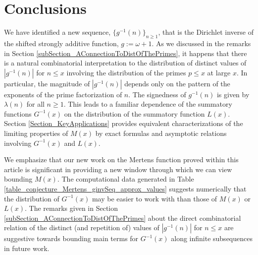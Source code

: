 \documentclass[11pt,reqno,a4letter]{article}
\numberwithin{figure}{section}
\numberwithin{table}{section}
\theoremstyle{plain}
\numberwithin{theorem}{section}
\theoremstyle{definition}
\begin{document}
\newpage
\section{Conclusions}

We have identified a new sequence, 
$\{g^{-1}(n)\}_{n \geq 1}$, that is the Dirichlet inverse of the 
shifted strongly additive function, $g := \omega + 1$. 
As we discussed in the remarks in 
Section \ref{subSection_AConnectionToDistOfThePrimes}, 
it happens that there is a natural combinatorial interpretation to the 
distribution of distinct values 
of $|g^{-1}(n)|$ for $n \leq x$ involving the distribution of the 
primes $p \leq x$ at large $x$. 
In particular, the magnitude of $|g^{-1}(n)|$ depends only on the pattern of 
the exponents of the prime factorization of $n$. 
The signedness of $g^{-1}(n)$ is given by $\lambda(n)$ for all $n \geq 1$. 
This leads to a familiar dependence of the 
summatory functions $G^{-1}(x)$ on the distribution of the summatory function $L(x)$. 
Section \ref{Section_KeyApplications} 
provides equivalent characterizations of the limiting properties of 
$M(x)$ by exact formulas and asymptotic relations involving 
$G^{-1}(x)$ and $L(x)$. 

We emphasize that our new work on the Mertens function proved within this article 
is significant in providing a new window through which we can view bounding $M(x)$. 
The computational data generated in 
Table \ref{table_conjecture_Mertens_ginvSeq_approx_values} suggests numerically 
that the distribution of $G^{-1}(x)$ may be easier to work with 
than those of $M(x)$ or $L(x)$. 
The remarks given in Section \ref{subSection_AConnectionToDistOfThePrimes} 
about the direct combinatorial 
relation of the distinct (and repetition of) values of $|g^{-1}(n)|$ 
for $n \leq x$ are suggestive towards bounding main terms for $G^{-1}(x)$ along 
infinite subsequences in future work. 
\end{document}
